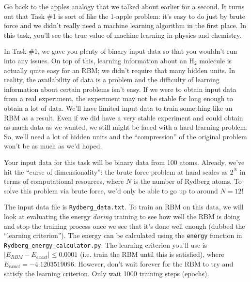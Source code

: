 \documentclass[12pt]{article}
\begin{document}
Go back to the apples analogy that we talked about earlier for a second. It turns out that Task \#1 is sort of like the 1-apple problem: it's easy to do just by brute force and we didn't really need a machine learning algorithm in the first place. In this task, you'll see the true value of machine learning in physics and chemistry. 

In Task \#1, we gave you plenty of binary input data so that you wouldn't run into any issues. On top of this, learning information about an H$_2$ molecule is actually quite easy for an RBM; we didn't require that many hidden units. In reality, the availability of data is a problem and the difficulty of learning information about certain problems isn't easy. If we were to obtain input data from a real experiment, the experiment may not be stable for long enough to obtain a lot of data. We'll have limited input data to train something like an RBM as a result. Even if we did have a very stable experiment and could obtain as much data as we wanted, we still might be faced with a hard learning problem. So, we'll need a lot of hidden units and the ``compression'' of the original problem won't be as much as we'd hoped.

Your input data for this task will be binary data from 100 atoms. Already, we've hit the ``curse of dimensionality'': the brute force problem at hand scales as $2^N$ in terms of computational resources, where $N$ is the number of Rydberg atoms. To solve this problem via brute force, we'd only be able to go up to around $N = 12$! 

The input data file is \texttt{Rydberg\_data.txt}. To train an RBM on this data, we will look at evaluating the energy \textit{during} training to see how well the RBM is doing and stop the training process once we see that it's done well enough (dubbed the ``learning criterion''). The energy can be calculated using the \texttt{energy} function in \texttt{Rydberg\_energy\_calculator.py}. The learning criterion you'll use is $\vert E_{RBM} - E_{exact} \vert \leq 0.0001$ (i.e. train the RBM until this is satisfied), where $E_{exact} = -4.1203519096$. However, don't wait forever for the RBM to try and satisfy the learning criterion. Only wait 1000 training steps (epochs).
\end{document}
